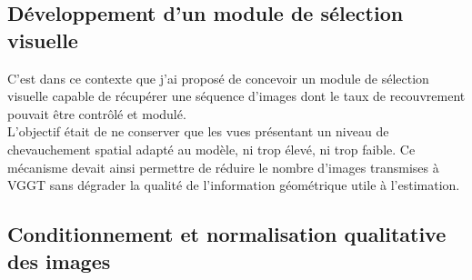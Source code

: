 \documentclass[12pt,a4paper,oneside]{report}
\begin{document}
\par\bigskip
\par\bigskip

\subsection{Développement d'un module de sélection visuelle}

\hspace*{.3cm}C'est dans ce contexte que j'ai proposé de concevoir un module de sélection visuelle capable de récupérer une séquence d'images dont le taux de recouvrement pouvait être contrôlé et modulé.\\

\hspace*{.3cm}L'objectif était de ne conserver que les vues présentant un niveau de chevauchement spatial adapté au modèle, ni trop élevé, ni trop faible. Ce mécanisme devait ainsi permettre de réduire le nombre d'images transmises à VGGT sans dégrader la qualité de l'information géométrique utile à l'estimation.\\

\par\bigskip
\par\bigskip

\subsection{Conditionnement et normalisation qualitative des images}
\end{document}
